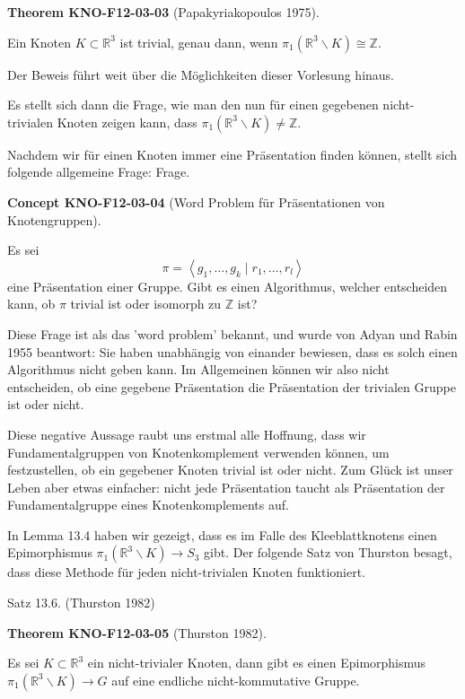 \documentclass[10pt, letterpaper]{article}
\newcommand{\CustomHeading}[3]{%
  \par\medskip\noindent%
  \textbf{#1 #2} \textnormal{(#3)}.\enskip%
}
\newenvironment{THEO}[2]{\begin{unitbox}\CustomHeading{Theorem}{#1}{#2}}{\end{unitbox}}
\newenvironment{CONC}[2]{\begin{unitbox}\CustomHeading{Concept}{#1}{#2}}{\end{unitbox}}
\begin{document}
\begin{THEO}{KNO-F12-03-03}{Papakyriakopoulos 1975}
Ein Knoten $K \subset \mathbb{R}^3$ ist trivial, genau dann, wenn $\pi_1\left(\mathbb{R}^3 \backslash K\right) \cong \mathbb{Z}$.
\end{THEO}


Der Beweis führt weit über die Möglichkeiten dieser Vorlesung hinaus. 


Es stellt sich dann die Frage, wie man den nun für einen gegebenen nicht-trivialen Knoten zeigen kann, dass $\pi_1\left(\mathbb{R}^3 \backslash K\right) \neq \mathbb{Z}$.


Nachdem wir für einen Knoten immer eine Präsentation finden können, stellt sich folgende allgemeine Frage:
Frage. 

\begin{CONC}{KNO-F12-03-04}{Word Problem für Präsentationen von Knotengruppen}
Es sei
$$
\pi=\left\langle g_1, \ldots, g_k \mid r_1, \ldots, r_l\right\rangle
$$
eine Präsentation einer Gruppe. Gibt es einen Algorithmus, welcher entscheiden kann, ob $\pi$ trivial ist oder isomorph zu $\mathbb{Z}$ ist?

Diese Frage ist als das 'word problem' bekannt, und wurde von Adyan und Rabin 1955 beantwort: Sie haben unabhängig von einander bewiesen, dass es solch einen Algorithmus nicht geben kann. Im Allgemeinen können wir also nicht entscheiden, ob eine gegebene Präsentation die Präsentation der trivialen Gruppe ist oder nicht.

Diese negative Aussage raubt uns erstmal alle Hoffnung, dass wir Fundamentalgruppen von Knotenkomplement verwenden können, um festzustellen, ob ein gegebener Knoten trivial ist oder nicht. Zum Glück ist unser Leben aber etwas einfacher: nicht jede Präsentation taucht als Präsentation der Fundamentalgruppe eines Knotenkomplements auf.
\end{CONC}

In Lemma 13.4 haben wir gezeigt, dass es im Falle des Kleeblattknotens einen Epimorphismus $\pi_1\left(\mathbb{R}^3 \backslash K\right) \rightarrow S_3$ gibt. Der folgende Satz von Thurston besagt, dass diese Methode für jeden nicht-trivialen Knoten funktioniert.

Satz 13.6. (Thurston 1982) 

\begin{THEO}{KNO-F12-03-05}{Thurston 1982}
Es sei $K \subset \mathbb{R}^3$ ein nicht-trivialer Knoten, dann gibt es einen Epimorphismus $\pi_1\left(\mathbb{R}^3 \backslash K\right) \rightarrow G$ auf eine endliche nicht-kommutative Gruppe.
\end{THEO}
\end{document}
